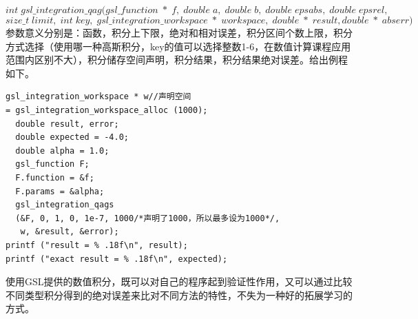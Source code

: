 \documentclass[a4paper,11pt,onecolumn,twoside]{article}
\begin{document}
$$
int\;gsl\_integration\_qag(gsl\_function\;*\;f,\;double\;a,\;double\;b,\;double\;epsabs,\;double\;epsrel,
$$
$$
size\_t\;limit,\;int\;key,\;gsl\_integration\_workspace\;*\;workspace,\;double\;*\;result,
double\;*\;abserr)
$$
参数意义分别是：函数，积分上下限，绝对和相对误差，积分区间个数上限，积分方式选择（使用哪一种高斯积分，key的值可以选择整数1-6，在数值计算课程应用范围内区别不大），积分储存空间声明，积分结果，积分结果绝对误差。给出例程如下。\par
\begin{lstlisting}
gsl_integration_workspace * w//声明空间
= gsl_integration_workspace_alloc (1000);
  double result, error;
  double expected = -4.0;
  double alpha = 1.0;
  gsl_function F;
  F.function = &f;
  F.params = &alpha;
  gsl_integration_qags 
  (&F, 0, 1, 0, 1e-7, 1000/*声明了1000，所以最多设为1000*/,
   w, &result, &error);
printf ("result = % .18f\n", result);
printf ("exact result = % .18f\n", expected);
\end{lstlisting}
使用GSL提供的数值积分，既可以对自己的程序起到验证性作用，又可以通过比较不同类型积分得到的绝对误差来比对不同方法的特性，不失为一种好的拓展学习的方式。
\end{document}
